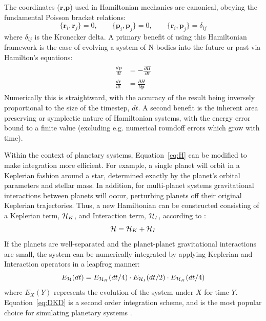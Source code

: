 The coordinates ($\textbf{r}$,$\textbf{p}$) used in Hamiltonian mechanics are canonical, obeying the fundamental Poisson bracket relations:
\begin{equation}
\{\textbf{r}_i, \textbf{r}_j\} = 0, \qquad
\{\textbf{p}_i, \textbf{p}_j\} = 0, \qquad
\{\textbf{r}_i, \textbf{p}_j\} = \delta_{ij}
\end{equation}
where $\delta_{ij}$ is the Kronecker delta. 
A primary benefit of using this Hamiltonian framework is the ease of evolving a system of N-bodies into the future or past via Hamilton's equations:
\begin{align}
\begin{split}
\frac{d\textbf{p}}{dt} &= -\frac{\partial H}{\partial \textbf{r}} \\
\frac{d\textbf{r}}{dt} &= \frac{\partial H}{\partial \textbf{p}} 
\label{eq:Heq}
\end{split}
\end{align}
Numerically this is straightward, with the accuracy of the result being inversely proportional to the size of the timestep, $dt$.
A second benefit is the inherent area preserving or symplectic nature of Hamiltonian systems, with the energy error bound to a finite value (excluding e.g. numerical roundoff errors which grow with time).

Within the context of planetary systems, Equation~\ref{eq:H} can be modified to make integration more efficient.
For example, a single planet will orbit in a Keplerian fashion around a star, determined exactly by the planet's orbital parameters and stellar mass. 
In addition, for multi-planet systems gravitational interactions between planets will occur, perturbing planets off their original Keplerian trajectories.
Thus, a new Hamiltonian can be constructed consisting of a Keplerian term, $\mathcal{H}_K$, and Interaction term, $\mathcal{H}_I$, according to \citep{Wisdom1991}:
\begin{equation*}
\mathcal{H} = \mathcal{H}_K + \mathcal{H}_I
\end{equation*}
If the planets are well-separated and the planet-planet gravitational interactions are small, the system can be numerically integrated by applying Keplerian and Interaction operators in a leapfrog manner:
\begin{equation}
E_{\mathcal{H}}(dt) = E_{\mathcal{H}_K}(dt/4) \cdot E_{\mathcal{H}_I}(dt/2) \cdot E_{\mathcal{H}_K}(dt/4)
\label{eq:DKD}
\end{equation}
where $E_{X}(Y)$ represents the evolution of the system under $X$ for time $Y$.
Equation~\ref{eq:DKD} is a second order integration scheme, and is the most popular choice for simulating planetary systems \citep{Wisdom1991}.

